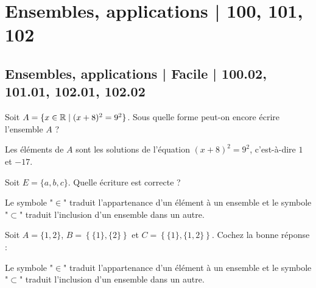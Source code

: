 





\section{Ensembles, applications | 100, 101, 102}

\subsection{Ensembles, applications | Facile | 100.02, 101.01, 102.01, 102.02}
\begin{question}
Soit $A=\{x\in \mathbb{R}\mid (x+8)^2=9^2\}$. Sous quelle forme peut-on encore écrire l'ensemble $A$ ?
\begin{answers}  
\end{answers}
\begin{explanations}
Les éléments de $A$ sont les solutions de l'équation $(x+8)^2=9^2$, c'est-à-dire $1$ et $-17$.
\end{explanations}
\end{question}


\begin{question}
Soit $E=\{a,b,c\}$. Quelle écriture est correcte ?
\begin{answers}  
\end{answers}
\begin{explanations}
Le symbole "$\in$" traduit l'appartenance d'un élément à un ensemble et le symbole "$\subset$" traduit l'inclusion d'un ensemble dans un autre.
\end{explanations}
\end{question}


\begin{question}
Soit $A=\{1,2\}$, $B=\left\{\{1\},\{2\}\right\}$ et $C=\left\{\{1\},\{1,2\}\right\}$. Cochez la bonne réponse :
\begin{answers}  
\end{answers}
\begin{explanations}
Le symbole "$\in$" traduit l'appartenance d'un élément à un ensemble et le symbole "$\subset$" traduit l'inclusion d'un ensemble dans un autre.
\end{explanations}
\end{question}


